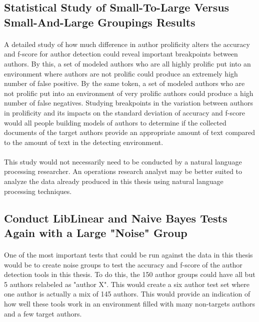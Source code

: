 \begin{singlespace}
\subsection{Statistical Study of Small-To-Large Versus Small-And-Large Groupings Results}
\end{singlespace}
\paragraph*{} A detailed study of how much difference in author prolificity alters the accuracy and f-score for author detection could reveal important breakpoints between authors.  By this, a set of modeled authors who are all highly prolific put into an environment where authors are not prolific could produce an extremely high number of false positive.  By the same token, a set of modeled authors who are not prolific put into an environment of very prolific authors could produce a high number of false negatives.  Studying breakpoints in the variation between authors in prolificity and its impacts on the standard deviation of accuracy and f-score would all people building models of authors to determine if the collected documents of the target authors provide an appropriate amount of text compared to the amount of text in the detecting environment.
\paragraph*{} This study would not necessarily need to be conducted by a natural language processing researcher.  An operations research analyst may be better suited to analyze the data already produced in this thesis using natural language processing techniques.

\begin{singlespace}
\subsection{Conduct LibLinear and Naive Bayes Tests Again with a Large "Noise" Group}
\end{singlespace}
\paragraph*{} One of the most important tests that could be run against the data in this thesis would be to create noise groups to test the accuracy and f-score of the author detection tools in this thesis.  To do this, the 150 author groups could have all but 5 authors relabeled as "author X".  This would create a six author test set where one author is actually a mix of 145 authors.  This would provide an indication of how well these tools work in an environment filled with many non-targets authors and a few target authors.
